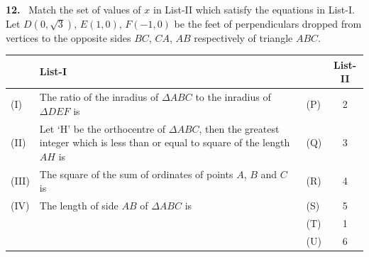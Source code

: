 \documentclass[10pt]{extarticle}
\newcommand{\qn}[1]{\par\smallskip\noindent\textbf{#1.}~}
\begin{document}
\noindent\begin{minipage}{\textwidth}
\qn{12} Match the set of values of $x$ in List-II which satisfy the equations in List-I.\\ Let $D(0,\sqrt3)$, $E(1,0)$, $F(-1,0)$ be the feet of perpendiculars dropped from vertices to the opposite sides $BC$, $CA$, $AB$ respectively of triangle $ABC$.\par\smallskip
\begin{center}\small\renewcommand{\arraystretch}{1.25}\setlength{\tabcolsep}{4pt}
\begin{tabular}{|l|p{10.5cm}|l|c|}
\hline & \textbf{List-I} & & \textbf{List-II} \\\hline
(I) & The ratio of the inradius of $\Delta ABC$ to the inradius of $\Delta DEF$ is & (P) & 2 \\\hline
(II) & Let `H' be the orthocentre of $\Delta ABC$, then the greatest integer which is less than or equal to square of the length $AH$ is & (Q) & 3 \\\hline
(III) & The square of the sum of ordinates of points $A$, $B$ and $C$ is & (R) & 4 \\\hline
(IV) & The length of side $AB$ of $\Delta ABC$ is & (S) & 5 \\\hline
 &  & (T) & 1 \\\hline
 &  & (U) & 6 \\\hline
\end{tabular}
\end{center}
\end{minipage}
\end{document}
